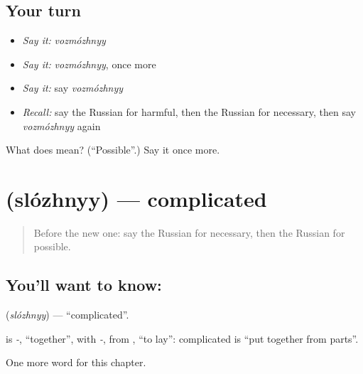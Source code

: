 \subsection*{Your turn}
\begin{itemize}
\raggedright
  \item \emph{Say it:} \emph{vozmózhnyy}
  \item \emph{Say it:} \emph{vozmózhnyy}, once more
  \item \emph{Say it:} say \emph{vozmózhnyy}
  \item \emph{Recall:} say the Russian for harmful, then the Russian for necessary, then say \emph{vozmózhnyy} again
\end{itemize}

\begin{tcolorbox}[breakable,colback=teal!4,colframe=teal!35!black,title={Before you move on}]
What does  mean? (\textquotedblleft{}Possible\textquotedblright{}.) Say it once more.
\end{tcolorbox}
\section[\texorpdfstring{\ru{сложный} (slózhnyy)}{сложный (slózhnyy)}]{ (slózhnyy) — complicated}

\label{lesson:RU-C188-slozhnyy}



\begin{quote}
Before the new one: say the Russian for necessary, then the Russian for possible.
\end{quote}

\subsection*{You'll want to know: }
\textbf{} (\emph{slózhnyy}) — \textquotedblleft{}complicated\textquotedblright{}.

\begin{cousinweb}
\textbf{} is \emph{-}, \textquotedblleft{}together\textquotedblright{}, with \emph{-}, from \emph{}, \textquotedblleft{}to lay\textquotedblright{}: complicated is \textquotedblleft{}put together from parts\textquotedblright{}.
\end{cousinweb}

\begin{grammarlens}[title={What you've built}]
One more word for this chapter.
\end{grammarlens}

